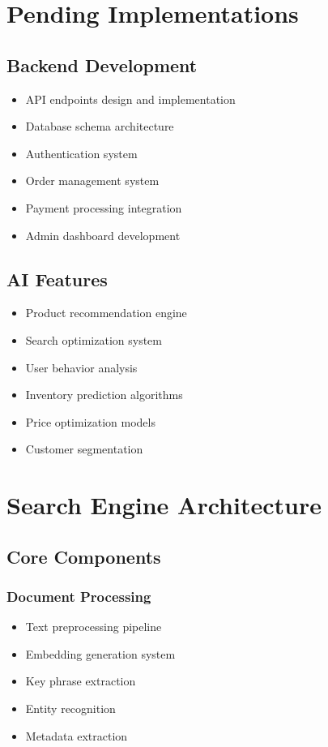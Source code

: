 \documentclass[12pt,a4paper]{article}
\begin{document}
\section{Pending Implementations}
\subsection{Backend Development}
\begin{itemize}
    \item API endpoints design and implementation
    \item Database schema architecture
    \item Authentication system
    \item Order management system
    \item Payment processing integration
    \item Admin dashboard development
\end{itemize}

\subsection{AI Features}
\begin{itemize}
    \item Product recommendation engine
    \item Search optimization system
    \item User behavior analysis
    \item Inventory prediction algorithms
    \item Price optimization models
    \item Customer segmentation
\end{itemize}

\section{Search Engine Architecture}
\subsection{Core Components}
\subsubsection{Document Processing}
\begin{itemize}
    \item Text preprocessing pipeline
    \item Embedding generation system
    \item Key phrase extraction
    \item Entity recognition
    \item Metadata extraction
\end{itemize}
\end{document}
